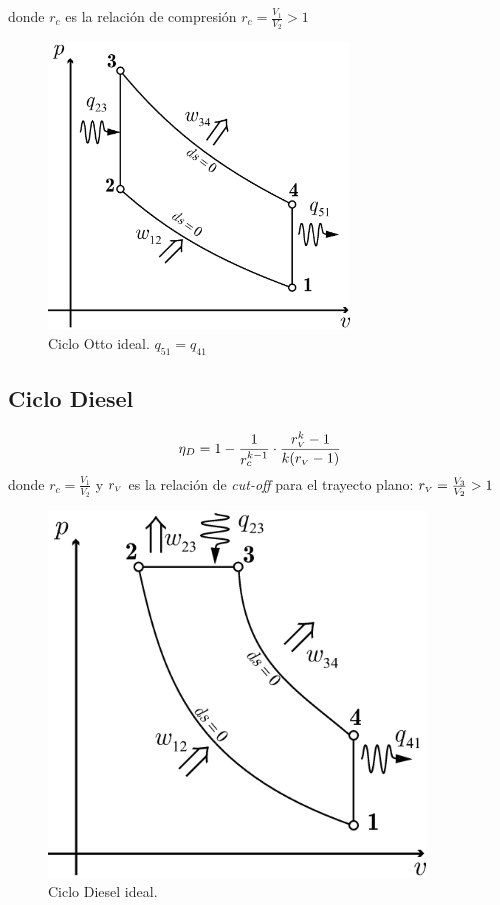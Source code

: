 \documentclass{article}
\newcommand{\ctegas}{k}
\newcommand{\rc}{r_c}
\newcommand{\rv}{r_{\mbox{\tiny$V$}}}
\begin{document}
donde $\rc$ es la relación de compresión $\rc=\frac{V_1}{V_2}>1$
\begin{figure}[htb!]
    \centering
    \includegraphics[width=8cm]{fig/ciclootto.eps}
    \caption{Ciclo Otto ideal. $q_{51}=q_{41}$}
    \label{fig:ottoideal}
\end{figure}

\subsection{Ciclo Diesel}

\begin{equation}
\eta_D=1-\frac{1}{\rc^{\ctegas-1}}\cdot\frac{\rv^k -1}{\ctegas(\rv-1)}
\end{equation}
donde $\rc=\frac{V_1}{V_2}$ y $\rv$ es la relación de \textit{cut-off} para el trayecto plano: $\rv=\frac{V_3}{V_2}>1$
\begin{figure}[htb!]
    \centering
    \includegraphics[width=10cm]{fig/ciclodiesel.eps}
    \caption{Ciclo Diesel ideal.}
    \label{fig:dieselideal}
\end{figure}
\end{document}
